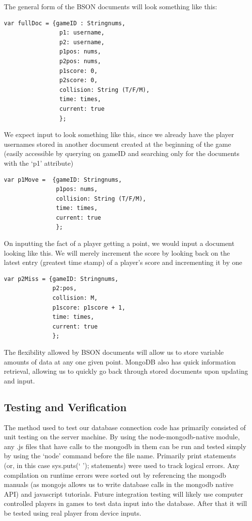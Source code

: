 \documentclass[letterpaper,12pt]{article}
\begin{document}
The general form of the BSON documents will look something like this:
\begin{verbatim}
var fullDoc = {gameID : Stringnums,
                p1: username, 
                p2: username, 
                p1pos: nums, 
                p2pos: nums, 
                p1score: 0, 
                p2score: 0, 
                collision: String (T/F/M), 
                time: times, 
                current: true
                };
\end{verbatim}
We expect input to look something like this, since we already have the player usernames stored in another document created at the beginning of the game (easily accessible by querying on gameID and searching only for the documents with the ‘p1’ attribute)
\begin{verbatim}
var p1Move =  {gameID: Stringnums,
               p1pos: nums,
               collision: String (T/F/M),
               time: times,
               current: true
               };
\end{verbatim}
On inputting the fact of a player getting a point, we would input a document looking like this. We will merely increment the score by looking back on the latest entry (greatest time stamp) of a player’s score and incrementing it by one
\begin{verbatim}
var p2Miss = {gameID: Stringnums,
              p2:pos,
              collision: M,
              p1score: p1score + 1,
              time: times,
              current: true
              };
\end{verbatim}
The flexibility allowed by BSON documents will allow us to store variable amounts of data at any one given point. MongoDB also has quick information retrieval, allowing us to quickly go back through stored documents upon updating and input.
\subsection{Testing and Verification}

The method used to test our database connection code has primarily consisted of unit testing on the server machine. By using the node-mongodb-native module, any .js files that have calls to the mongodb in them can be run and tested simply by using the ‘node’ command before the file name. Primarily print statements (or, in this case sys.puts(‘ ’); statements) were used to track logical errors. Any compilation on runtime errors were sorted out by referencing the mongodb manuals (as mongojs allows us to write database calls in the mongodb native API) and javascript tutorials. Future integration testing will likely use computer controlled players in games to test data input into the database. After that it will be tested using real player from device inputs.
\end{document}
